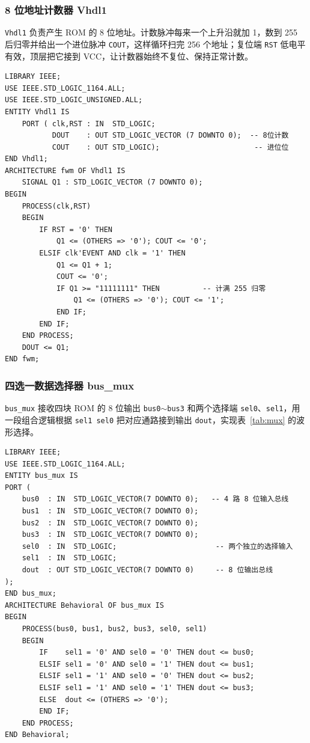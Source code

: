 \documentclass[12pt]{ctexart}
\begin{document}
\subsubsection{8 位地址计数器 Vhdl1}

\texttt{Vhdl1} 负责产生 ROM 的 8 位地址。计数脉冲每来一个上升沿就加 1，数到 255 后归零并给出一个进位脉冲 \texttt{COUT}，这样循环扫完 256 个地址；复位端 \texttt{RST} 低电平有效，顶层把它接到 VCC，让计数器始终不复位、保持正常计数。

\begin{verbatim}
LIBRARY IEEE;
USE IEEE.STD_LOGIC_1164.ALL;
USE IEEE.STD_LOGIC_UNSIGNED.ALL;
ENTITY Vhdl1 IS
    PORT ( clk,RST : IN  STD_LOGIC;
           DOUT    : OUT STD_LOGIC_VECTOR (7 DOWNTO 0);  -- 8位计数
           COUT    : OUT STD_LOGIC);                      -- 进位位
END Vhdl1;
ARCHITECTURE fwm OF Vhdl1 IS
    SIGNAL Q1 : STD_LOGIC_VECTOR (7 DOWNTO 0);
BEGIN
    PROCESS(clk,RST)
    BEGIN
        IF RST = '0' THEN
            Q1 <= (OTHERS => '0'); COUT <= '0';
        ELSIF clk'EVENT AND clk = '1' THEN
            Q1 <= Q1 + 1;
            COUT <= '0';
            IF Q1 >= "11111111" THEN          -- 计满 255 归零
                Q1 <= (OTHERS => '0'); COUT <= '1';
            END IF;
        END IF;
    END PROCESS;
    DOUT <= Q1;
END fwm;
\end{verbatim}
\label{lst:vhdl1}

\subsubsection{四选一数据选择器 bus\_mux}

\texttt{bus\_mux} 接收四块 ROM 的 8 位输出 \texttt{bus0}$\sim$\texttt{bus3} 和两个选择端 \texttt{sel0}、\texttt{sel1}，用一段组合逻辑根据 \texttt{sel1 sel0} 把对应通路接到输出 \texttt{dout}，实现表~\ref{tab:mux} 的波形选择。

\begin{verbatim}
LIBRARY IEEE;
USE IEEE.STD_LOGIC_1164.ALL;
ENTITY bus_mux IS
PORT (
    bus0  : IN  STD_LOGIC_VECTOR(7 DOWNTO 0);   -- 4 路 8 位输入总线
    bus1  : IN  STD_LOGIC_VECTOR(7 DOWNTO 0);
    bus2  : IN  STD_LOGIC_VECTOR(7 DOWNTO 0);
    bus3  : IN  STD_LOGIC_VECTOR(7 DOWNTO 0);
    sel0  : IN  STD_LOGIC;                       -- 两个独立的选择输入
    sel1  : IN  STD_LOGIC;
    dout  : OUT STD_LOGIC_VECTOR(7 DOWNTO 0)     -- 8 位输出总线
);
END bus_mux;
ARCHITECTURE Behavioral OF bus_mux IS
BEGIN
    PROCESS(bus0, bus1, bus2, bus3, sel0, sel1)
    BEGIN
        IF    sel1 = '0' AND sel0 = '0' THEN dout <= bus0;
        ELSIF sel1 = '0' AND sel0 = '1' THEN dout <= bus1;
        ELSIF sel1 = '1' AND sel0 = '0' THEN dout <= bus2;
        ELSIF sel1 = '1' AND sel0 = '1' THEN dout <= bus3;
        ELSE  dout <= (OTHERS => '0');
        END IF;
    END PROCESS;
END Behavioral;
\end{verbatim}
\label{lst:busmux}
\end{document}

